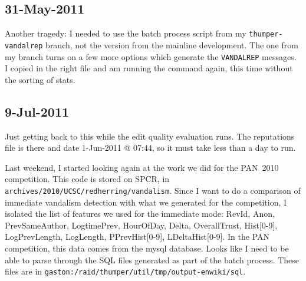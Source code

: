 \subsection{31-May-2011}

Another tragedy: I needed to use the batch process script from
my \texttt{thumper-vandalrep} branch, not the version from the
mainline development.
The one from my branch turns on a few more options which generate
the \texttt{VANDALREP} messages.
I copied in the right file and am running the command again,
this time without the sorting of stats.

\subsection{9-Jul-2011}

Just getting back to this while the edit quality evaluation runs.
The reputations file is there and date 1-Jun-2011 @ 07:44,
so it must take less than a day to run.

Last weekend, I started looking again at the work we did
for the PAN~2010 competition.
This code is stored on SPCR, in
\texttt{archives/2010/UCSC/redherring/vandalism}.
Since I want to do a comparison of immediate vandalism
detection with what we generated for the competition,
I isolated the list of features we used for the immediate mode:
RevId, Anon, PrevSameAuthor, LogtimePrev, HourOfDay,
Delta, OverallTrust, Hist[0-9], LogPrevLength,
LogLength, PPrevHist[0-9], LDeltaHist[0-9].
In the PAN competition, this data comes from the mysql database.
Looks like I need to be able to parse through the SQL files
generated as part of the batch process.
These files are in
\texttt{gaston:/raid/thumper/util/tmp/output-enwiki/sql}.

